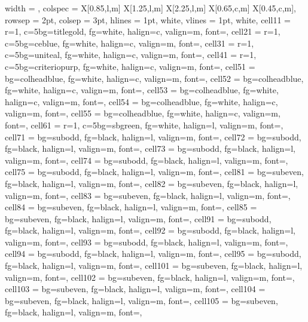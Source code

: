\documentclass[a4paper,12pt]{article}
\begin{document}
\noindent
\begin{longtblr}{
  width = \textwidth,
  colspec = {X[0.85,l,m] X[1.25,l,m] X[2.25,l,m] X[0.65,c,m] X[0.45,c,m]},
  rowsep = 2pt,
  colsep = 3pt,
  hlines = {1pt, white},
  vlines = {1pt, white},
  cell{1}{1} = {r=1, c=5}{bg=titlegold, fg=white, halign=c, valign=m, font=\large\bfseries},
  cell{2}{1} = {r=1, c=5}{bg=ceblue, fg=white, halign=c, valign=m, font=\small\bfseries},
  cell{3}{1} = {r=1, c=5}{bg=uniteal, fg=white, halign=c, valign=m, font=\small\bfseries},
  cell{4}{1} = {r=1, c=5}{bg=criteriopurp, fg=white, halign=c, valign=m, font=\small\bfseries},
  cell{5}{1} = {bg=colheadblue, fg=white, halign=c, valign=m, font=\bfseries},
  cell{5}{2} = {bg=colheadblue, fg=white, halign=c, valign=m, font=\bfseries},
  cell{5}{3} = {bg=colheadblue, fg=white, halign=c, valign=m, font=\bfseries},
  cell{5}{4} = {bg=colheadblue, fg=white, halign=c, valign=m, font=\bfseries},
  cell{5}{5} = {bg=colheadblue, fg=white, halign=c, valign=m, font=\bfseries},
  cell{6}{1} = {r=1, c=5}{bg=sbgreen, fg=white, halign=l, valign=m, font=\small\bfseries},
  cell{7}{1} = {bg=subodd, fg=black, halign=l, valign=m, font=\footnotesize},
  cell{7}{2} = {bg=subodd, fg=black, halign=l, valign=m, font=\footnotesize},
  cell{7}{3} = {bg=subodd, fg=black, halign=l, valign=m, font=\footnotesize},
  cell{7}{4} = {bg=subodd, fg=black, halign=l, valign=m, font=\footnotesize},
  cell{7}{5} = {bg=subodd, fg=black, halign=l, valign=m, font=\footnotesize},
  cell{8}{1} = {bg=subeven, fg=black, halign=l, valign=m, font=\footnotesize},
  cell{8}{2} = {bg=subeven, fg=black, halign=l, valign=m, font=\footnotesize},
  cell{8}{3} = {bg=subeven, fg=black, halign=l, valign=m, font=\footnotesize},
  cell{8}{4} = {bg=subeven, fg=black, halign=l, valign=m, font=\footnotesize},
  cell{8}{5} = {bg=subeven, fg=black, halign=l, valign=m, font=\footnotesize},
  cell{9}{1} = {bg=subodd, fg=black, halign=l, valign=m, font=\footnotesize},
  cell{9}{2} = {bg=subodd, fg=black, halign=l, valign=m, font=\footnotesize},
  cell{9}{3} = {bg=subodd, fg=black, halign=l, valign=m, font=\footnotesize},
  cell{9}{4} = {bg=subodd, fg=black, halign=l, valign=m, font=\footnotesize},
  cell{9}{5} = {bg=subodd, fg=black, halign=l, valign=m, font=\footnotesize},
  cell{10}{1} = {bg=subeven, fg=black, halign=l, valign=m, font=\footnotesize},
  cell{10}{2} = {bg=subeven, fg=black, halign=l, valign=m, font=\footnotesize},
  cell{10}{3} = {bg=subeven, fg=black, halign=l, valign=m, font=\footnotesize},
  cell{10}{4} = {bg=subeven, fg=black, halign=l, valign=m, font=\footnotesize},
  cell{10}{5} = {bg=subeven, fg=black, halign=l, valign=m, font=\footnotesize},
}
\end{longtblr}
\end{document}
